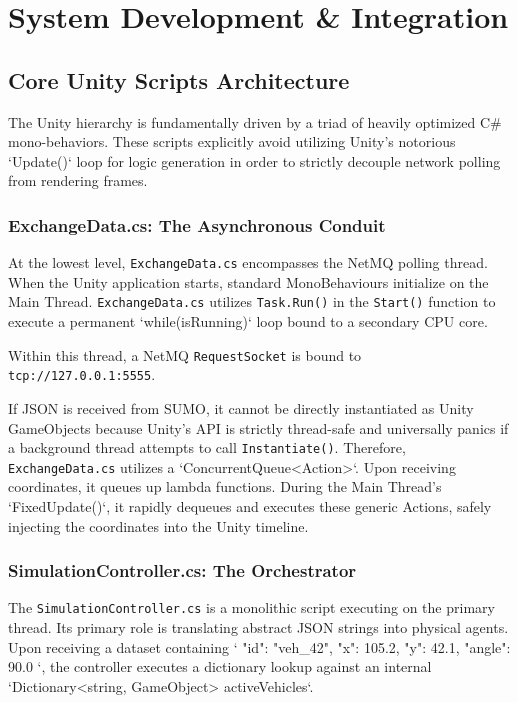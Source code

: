 \chapter{System Development \& Integration}

\section{Core Unity Scripts Architecture}

The Unity hierarchy is fundamentally driven by a triad of heavily optimized C\# mono-behaviors. These scripts explicitly avoid utilizing Unity's notorious `Update()` loop for logic generation in order to strictly decouple network polling from rendering frames. 

\subsection{ExchangeData.cs: The Asynchronous Conduit}

At the lowest level, \texttt{ExchangeData.cs} encompasses the NetMQ polling thread. When the Unity application starts, standard MonoBehaviours initialize on the Main Thread. \texttt{ExchangeData.cs} utilizes \texttt{Task.Run()} in the \texttt{Start()} function to execute a permanent `while(isRunning)` loop bound to a secondary CPU core. 

Within this thread, a NetMQ \texttt{RequestSocket} is bound to \texttt{tcp://127.0.0.1:5555}. 

If JSON is received from SUMO, it cannot be directly instantiated as Unity GameObjects because Unity's API is strictly thread-safe and universally panics if a background thread attempts to call \texttt{Instantiate()}. Therefore, \texttt{ExchangeData.cs} utilizes a `ConcurrentQueue<Action>`. Upon receiving coordinates, it queues up lambda functions. During the Main Thread's `FixedUpdate()`, it rapidly dequeues and executes these generic Actions, safely injecting the coordinates into the Unity timeline.

\subsection{SimulationController.cs: The Orchestrator}

The \texttt{SimulationController.cs} is a monolithic script executing on the primary thread. Its primary role is translating abstract JSON strings into physical agents. Upon receiving a dataset containing `{ "id": "veh_42", "x": 105.2, "y": 42.1, "angle": 90.0 }`, the controller executes a dictionary lookup against an internal `Dictionary<string, GameObject> activeVehicles`.

